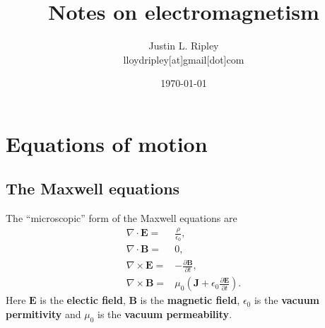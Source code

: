 \documentclass[12pt]{report}
\newcommand{\bB}{{\bm B}}
\newcommand{\bE}{{\bm E}}
\newcommand{\bJ}{{\bm J}}
\begin{document}
\title{
{Notes on electromagnetism}\\
}
\author{Justin L. Ripley 
   \\ \small{lloydripley[at]gmail[dot]com}
   }
\date{\today}

\maketitle

\chapter{Equations of motion}

\section{The Maxwell equations}

The ``microscopic'' form of the Maxwell equations are
\begin{subequations}
\label{eq:microscopic-Maxwell}
\begin{align}
\label{eq:microscopic-Maxwell-divE}
    \nabla \cdot \bE
    =&
    \frac{\rho}{\epsilon_0}
    ,\\
    \nabla \cdot \bB
\label{eq:microscopic-Maxwell-divB}
    =&
    0
    ,\\
\label{eq:microscopic-Maxwell-crossE}
    \nabla \times {\bE} 
    =&
    -
    \frac{\partial \bB}{\partial t}
    ,\\
\label{eq:microscopic-Maxwell-crossB}
    \nabla \times \bB
    =&
    \mu_0\left(\bJ + \epsilon_0\frac{\partial \bE}{\partial t}\right)
    .
\end{align}
\end{subequations}
Here $\bE$ is the \textbf{electic field}, $\bB$ is the \textbf{magnetic field}, $\epsilon_0$ is the \textbf{vacuum permitivity} and $\mu_0$ is the \textbf{vacuum permeability}.
\end{document}
